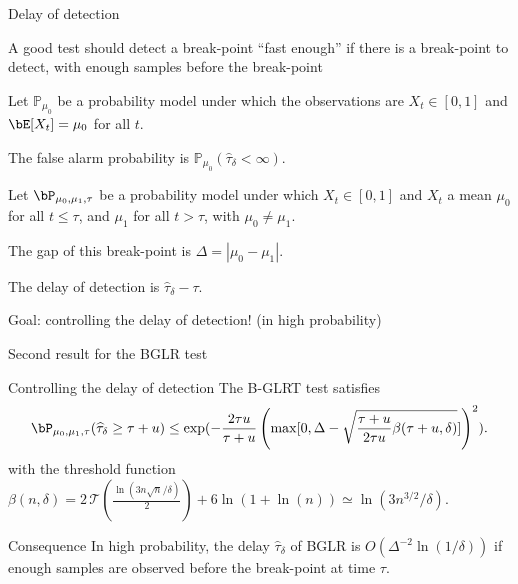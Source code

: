 \documentclass[11pt,english,ignorenonframetext,]{beamer}
\begin{document}
\begin{frame}{Delay of detection}

  A good test should detect a break-point ``fast enough'' if there is a break-point to detect, with enough samples before the break-point

  \begin{block}
    Let $\mathbb{P}_{\mu_0}$ be a probability model under which the observations are $X_t \in[0,1]$
    and $\bE[X_t] = \mu_0$ for all $t$.

    The \alert{false alarm probability} is $\mathbb{P}_{\mu_0}(\widehat{\tau}_\delta < \infty)$.
  \end{block}

  \begin{block}
    Let $\bP_{\mu_0,\mu_1,\tau}$ be a probability model under which $X_t \in[0,1]$ and $X_t$ a mean $\mu_0$ for all $t \leq \tau$, and $\mu_1$ for all $t > \tau$,
    with $\mu_0 \neq \mu_1$.

    The \alert{gap} of this break-point is $\Delta = |\mu_0 - \mu_1|$.

    The \alert{delay of detection} is $\widehat{\tau}_{\delta} - \tau$.
  \end{block}

  \alert{Goal: controlling the delay of detection!} (in high probability)

\end{frame}

\begin{frame}{Second result for the BGLR test}

  \begin{block}{Controlling the delay of detection}
      The B-GLRT test satisfies
      \[ \bP_{\mu_0,\mu_1,\tau} (\widehat{\tau}_{\delta} \geq \tau + u) \leq \exp( -\frac{2\tau u}{\tau + u}\left(\max[ 0, \Delta - \sqrt{\frac{\tau + u}{2\tau u} \beta(\tau + u,\delta)} ]\right)^2 ). \]
      with the threshold function
      $\beta(n,\delta)= 2\,\mathcal{T}(\frac{\ln(3n\sqrt{n}/\delta)}{2}) + 6\ln(1+\ln(n)) \simeq \ln(3n^{3/2}/\delta)$.
  \end{block}

  \begin{block}{Consequence}
    In high probability, the delay $\widehat{\tau}_\delta$ of BGLR is $O(\Delta^{-2} \ln(1/\delta))$ if enough samples are observed before the break-point at time $\tau$.
  \end{block}

\end{frame}
\end{document}
